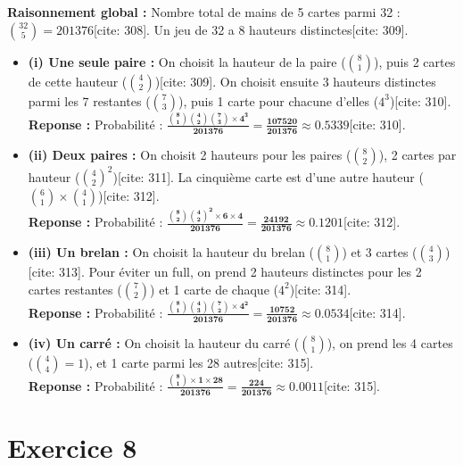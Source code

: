 \documentclass[11pt,a4paper]{article}
\begin{document}
\textbf{Raisonnement global :} Nombre total de mains de 5 cartes parmi 32 : $\binom{32}{5} = 201376$[cite: 308]. Un jeu de 32 a 8 hauteurs distinctes[cite: 309].

\begin{itemize}
    \item \textbf{(i) Une seule paire :} On choisit la hauteur de la paire ($\binom{8}{1}$), puis 2 cartes de cette hauteur ($\binom{4}{2}$)[cite: 309]. On choisit ensuite 3 hauteurs distinctes parmi les 7 restantes ($\binom{7}{3}$), puis 1 carte pour chacune d'elles ($4^3$)[cite: 310].\\
    \textbf{Reponse :} Probabilité : $\mathbf{\frac{\binom{8}{1}\binom{4}{2}\binom{7}{3} \times 4^3}{201376} = \frac{107520}{201376} \approx 0.5339}$[cite: 310].
    
    \item \textbf{(ii) Deux paires :} On choisit 2 hauteurs pour les paires ($\binom{8}{2}$), 2 cartes par hauteur ($\binom{4}{2}^2$)[cite: 311]. La cinquième carte est d'une autre hauteur ($\binom{6}{1} \times \binom{4}{1}$)[cite: 312].\\
    \textbf{Reponse :} Probabilité : $\mathbf{\frac{\binom{8}{2}\binom{4}{2}^2 \times 6 \times 4}{201376} = \frac{24192}{201376} \approx 0.1201}$[cite: 312].
    
    \item \textbf{(iii) Un brelan :} On choisit la hauteur du brelan ($\binom{8}{1}$) et 3 cartes ($\binom{4}{3}$)[cite: 313]. Pour éviter un full, on prend 2 hauteurs distinctes pour les 2 cartes restantes ($\binom{7}{2}$) et 1 carte de chaque ($4^2$)[cite: 314].\\
    \textbf{Reponse :} Probabilité : $\mathbf{\frac{\binom{8}{1}\binom{4}{3}\binom{7}{2} \times 4^2}{201376} = \frac{10752}{201376} \approx 0.0534}$[cite: 314].
    
    \item \textbf{(iv) Un carré :} On choisit la hauteur du carré ($\binom{8}{1}$), on prend les 4 cartes ($\binom{4}{4} = 1$), et 1 carte parmi les 28 autres[cite: 315].\\
    \textbf{Reponse :} Probabilité : $\mathbf{\frac{\binom{8}{1} \times 1 \times 28}{201376} = \frac{224}{201376} \approx 0.0011}$[cite: 315].
\end{itemize}

\hrulefill

\section*{Exercice 8}
\end{document}
